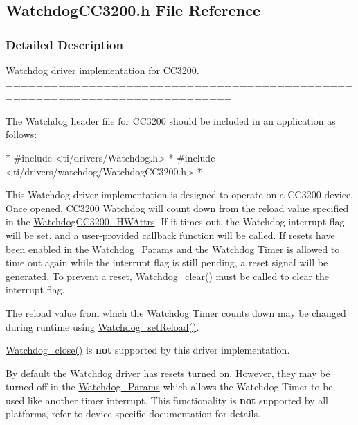 \subsection{Watchdog\-C\-C3200.\-h File Reference}
\label{_watchdog_c_c3200_8h}


\subsubsection{Detailed Description}
Watchdog driver implementation for C\-C3200. ============================================================================

The Watchdog header file for C\-C3200 should be included in an application as follows\-: 
\begin{DoxyCode}
*  #include <ti/drivers/Watchdog.h>
*  #include <ti/drivers/watchdog/WatchdogCC3200.h>
*  
\end{DoxyCode}


This Watchdog driver implementation is designed to operate on a C\-C3200 device. Once opened, C\-C3200 Watchdog will count down from the reload value specified in the \hyperlink{struct_watchdog_c_c3200___h_w_attrs}{Watchdog\-C\-C3200\-\_\-\-H\-W\-Attrs}. If it times out, the Watchdog interrupt flag will be set, and a user-\/provided callback function will be called. If resets have been enabled in the \hyperlink{struct_watchdog___params}{Watchdog\-\_\-\-Params} and the Watchdog Timer is allowed to time out again while the interrupt flag is still pending, a reset signal will be generated. To prevent a reset, \hyperlink{_watchdog_8h_a396decd6b1807db10c636f9987c3be4c}{Watchdog\-\_\-clear()} must be called to clear the interrupt flag.

The reload value from which the Watchdog Timer counts down may be changed during runtime using \hyperlink{_watchdog_8h_a77ec81e1304fe05b77a9976e10e2d9a3}{Watchdog\-\_\-set\-Reload()}.

\hyperlink{_watchdog_8h_a1c0dfea7011b06f303d01afb631ffbdd}{Watchdog\-\_\-close()} is {\bfseries not} supported by this driver implementation.

By default the Watchdog driver has resets turned on. However, they may be turned off in the \hyperlink{struct_watchdog___params}{Watchdog\-\_\-\-Params} which allows the Watchdog Timer to be used like another timer interrupt. This functionality is {\bfseries not} supported by all platforms, refer to device specific documentation for details.

